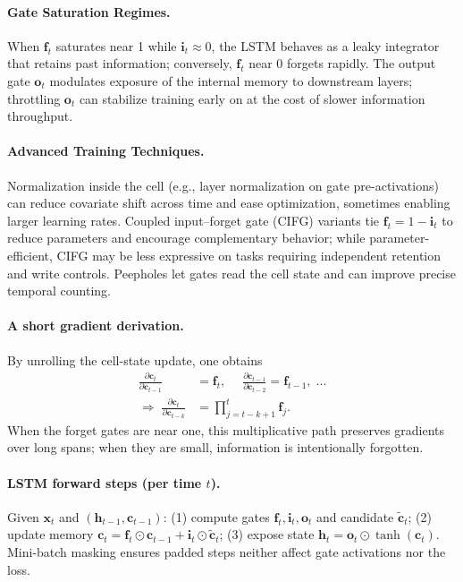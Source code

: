 \paragraph{Gate Saturation Regimes.} When \(\mathbf{f}_t\) saturates near 1 while \(\mathbf{i}_t \approx 0\), the LSTM behaves as a leaky integrator that retains past information; conversely, \(\mathbf{f}_t\) near 0 forgets rapidly. The output gate \(\mathbf{o}_t\) modulates exposure of the internal memory to downstream layers; throttling \(\mathbf{o}_t\) can stabilize training early on at the cost of slower information throughput.

\paragraph{Advanced Training Techniques.} Normalization inside the cell (e.g., layer normalization on gate pre-activations) can reduce covariate shift across time and ease optimization, sometimes enabling larger learning rates. Coupled input–forget gate (CIFG) variants tie \(\mathbf{f}_t = 1-\mathbf{i}_t\) to reduce parameters and encourage complementary behavior; while parameter-efficient, CIFG may be less expressive on tasks requiring independent retention and write controls. Peepholes let gates read the cell state and can improve precise temporal counting.

\paragraph{A short gradient derivation.} By unrolling the cell-state update, one obtains
\begin{align}
\frac{\partial \mathbf{c}_t}{\partial \mathbf{c}_{t-1}} &= \mathbf{f}_t,\quad\; \frac{\partial \mathbf{c}_{t-1}}{\partial \mathbf{c}_{t-2}} = \mathbf{f}_{t-1},\; \ldots \\
\Rightarrow\; \frac{\partial \mathbf{c}_t}{\partial \mathbf{c}_{t-k}} &= \prod_{j=t-k+1}^{t} \mathbf{f}_j.
\end{align}
When the forget gates are near one, this multiplicative path preserves gradients over long spans; when they are small, information is intentionally forgotten.

\paragraph{LSTM forward steps (per time \(t\)).} Given \(\mathbf{x}_t\) and \((\mathbf{h}_{t-1},\mathbf{c}_{t-1})\): (1) compute gates \(\mathbf{f}_t,\mathbf{i}_t,\mathbf{o}_t\) and candidate \(\tilde{\mathbf{c}}_t\); (2) update memory \(\mathbf{c}_t = \mathbf{f}_t\odot\mathbf{c}_{t-1}+\mathbf{i}_t\odot\tilde{\mathbf{c}}_t\); (3) expose state \(\mathbf{h}_t = \mathbf{o}_t\odot \tanh(\mathbf{c}_t)\). Mini-batch masking ensures padded steps neither affect gate activations nor the loss.


